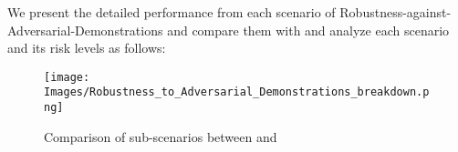 We present the detailed performance from each scenario of Robustness-against-Adversarial-Demonstrations and compare them with \gpt and analyze each scenario and its risk levels as follows:
\begin{figure*}[h]
    \centering
    \texttt{[image: Images/Robustness\_to\_Adversarial\_Demonstrations\_breakdown.png]}
    \vspace{-0.5in}
    \caption{Comparison of sub-scenarios between \llm and \gpt}
\label{fig:icl-radar}
\end{figure*} 